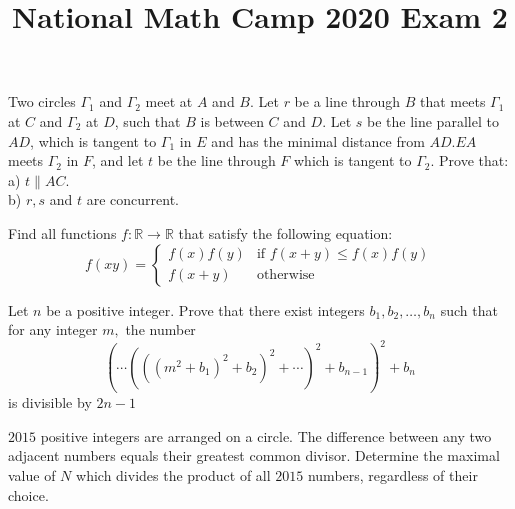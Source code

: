 \documentclass[12pt]{article}
\title{\vspace{-3em}National Math Camp 2020 Exam 2}
\begin{document}
\maketitle
\thispagestyle{empty}
\vspace{2em}

\begin{problem}
    Two circles $\Gamma_{1}$ and $\Gamma_{2}$ meet at $A$ and $B$. Let $r$ be
    a line through $B$ that meets $\Gamma_{1}$ at $C$ and $\Gamma_{2}$ at $D$,
    such that $B$ is between $C$ and $D$. Let $s$ be the line parallel to $A
    D$, which is tangent to $\Gamma_{1}$ in $E$ and has the minimal distance
    from $A D . E A$ meets $\Gamma_{2}$ in $F$, and let $t$ be the line
    through $F$ which is tangent to $\Gamma_{2}$. Prove that:\\

    a) $t \parallel A C$.\\

    b) $r, s$ and $t$ are concurrent.
\end{problem}

\begin{problem}
    Find all functions $f:\mathbb{R}\to\mathbb{R}$ that satisfy the
    following equation:
    \[f(xy) = \begin{cases}
        f(x)f(y) & \text{if } f(x+y) \le f(x)f(y)\\
        f(x+y) & \text{otherwise}
    \end{cases}\] 
\end{problem}

\begin{problem}
    Let $n$ be a positive integer. Prove that there exist integers $b_{1},
    b_{2}, \ldots, b_{n}$ such that for any integer $m,$ the number
    \[\left(\cdots\left(\left(\left(m^{2}+b_{1}\right)^{2}+b_{2}\right)^{2}+
    \cdots\right)^{2}+b_{n-1}\right)^{2}+b_{n}\]
    is divisible by $2 n-1$
\end{problem}

\begin{problem}
    $2015$ positive integers are arranged on a circle. The
    difference between any two adjacent numbers equals their greatest common
    divisor. Determine the maximal value of $N$ which divides the
    product of all $2015$ numbers, regardless of their choice.
\end{problem}
    
\end{document}
